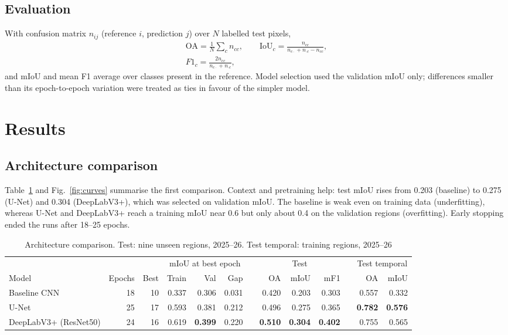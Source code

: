 \documentclass[12pt,conference]{IEEEtran}
\begin{document}
\subsection{Evaluation}

With confusion matrix $n_{ij}$ (reference $i$, prediction $j$) over $N$ labelled test pixels,
\begin{gather}
\mathrm{OA}=\frac{1}{N}\sum_c n_{cc},\qquad
\mathrm{IoU}_c=\frac{n_{cc}}{n_{c\cdot}+n_{\cdot c}-n_{cc}},\\
F1_c=\frac{2n_{cc}}{n_{c\cdot}+n_{\cdot c}},
\end{gather}
and mIoU and mean F1 average over classes present in the reference. Model selection used the validation mIoU only;
differences smaller than its epoch-to-epoch variation were treated as ties in favour of the simpler model.

\section{Results}

\subsection{Architecture comparison}

Table~\ref{tab:main} and Fig.~\ref{fig:curves} summarise the first comparison. Context and pretraining help: test mIoU
rises from 0.203 (baseline) to 0.275 (U-Net) and 0.304 (DeepLabV3+), which was selected on validation mIoU. The
baseline is weak even on training data (underfitting), whereas U-Net and DeepLabV3+ reach a training mIoU near 0.6 but
only about 0.4 on the validation regions (overfitting). Early stopping ended the runs after 18--25 epochs.

\begin{table}[t]
\caption{Architecture comparison. Test: nine unseen regions, 2025--26. Test temporal: training regions, 2025--26}
\label{tab:main}
\centering\footnotesize
\begin{tabular}{@{}lrrrrrcrrrcrr@{}}
\toprule
& & & \multicolumn{3}{c}{mIoU at best epoch} && \multicolumn{3}{c}{Test} && \multicolumn{2}{c}{Test temporal} \\
\cmidrule{4-6}\cmidrule{8-10}\cmidrule{12-13}
Model & Epochs & Best & Train & Val & Gap && OA & mIoU & mF1 && OA & mIoU \\
\midrule
Baseline CNN & 18 & 10 & 0.337 & 0.306 & 0.031 && 0.420 & 0.203 & 0.303 && 0.557 & 0.332 \\
U-Net & 25 & 17 & 0.593 & 0.381 & 0.212 && 0.496 & 0.275 & 0.365 && \textbf{0.782} & \textbf{0.576} \\
DeepLabV3+ (ResNet50) & 24 & 16 & 0.619 & \textbf{0.399} & 0.220 && \textbf{0.510} & \textbf{0.304} & \textbf{0.402} && 0.755 & 0.565 \\
\bottomrule
\end{tabular}
\end{table}
\end{document}
